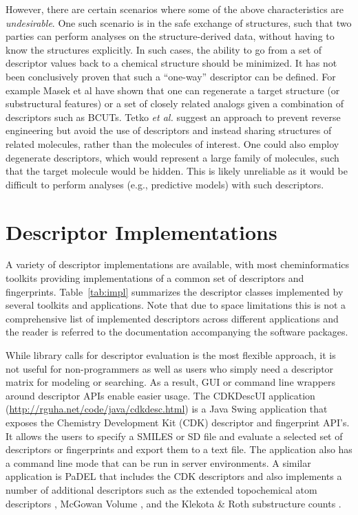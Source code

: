 \documentclass[letterpaper, 12pt]{article}
\begin{document}
However, there are certain scenarios where some of the above
characteristics are \emph{undesirable}. One such scenario is in the
safe exchange of structures, such that two parties can perform
analyses on the structure-derived data, without having to know the
structures explicitly. In such cases, the ability to go from a set of
descriptor values back to a chemical structure should be minimized. It
has not been conclusively proven that such a ``one-way'' descriptor
can be defined. For example Masek et al \cite{Masek:2008aa} have shown
that one can regenerate a target structure (or substructural features)
or a set of closely related analogs given a combination of descriptors
such as BCUTs. Tetko \textit{et al.} \cite{Tetko:2005fk} suggest an approach to
prevent reverse engineering but avoid the use of descriptors and
instead sharing structures of related molecules, rather than the
molecules of interest. One could also employ degenerate descriptors,
which would represent a large family of molecules, such that the
target molecule would be hidden. This is likely unreliable as it would
be difficult to perform analyses (e.g., predictive models) with such
descriptors.

\section{Descriptor Implementations}
\label{sec:descr-impl}

A variety of descriptor implementations are available, with most
cheminformatics toolkits providing implementations of a common set of
descriptors and fingerprints. Table~\ref{tab:impl} summarizes the
descriptor classes implemented by several toolkits and
applications. Note that due to space limitations this is not a
comprehensive list of implemented descriptors across different
applications and the reader is referred to the documentation
accompanying the software packages.

While library calls for descriptor evaluation is the most flexible
approach, it is not useful for non-programmers as well as users who
simply need a descriptor matrix for modeling or searching. As a
result, GUI or command line wrappers around descriptor APIs enable
easier usage. The CDKDescUI application
(\url{http://rguha.net/code/java/cdkdesc.html}) is a Java Swing
application that exposes the Chemistry Development Kit (CDK) descriptor and fingerprint API's. It
allows the users to specify a SMILES or SD file and evaluate a
selected set of descriptors or fingerprints and export them to a text
file. The application also has a command line mode that can be run in
server environments. A similar application is PaDEL \cite{Yap:2011fk}
that includes the CDK descriptors and also implements a number of
additional descriptors such as the extended topochemical atom
descriptors \cite{Roy:2004uq}, McGowan Volume \cite{Zhao:2003kx}, and
the Klekota \& Roth substructure counts \cite{Klekota:2008vn}.
\end{document}
